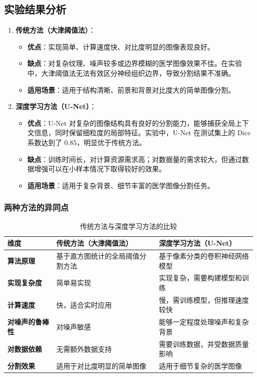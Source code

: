 \documentclass[12pt]{ctexart}
\begin{document}
\subsection*{实验结果分析}
\begin{enumerate}
    \item \textbf{传统方法（大津阈值法）}：
    \begin{itemize}
        \item \textbf{优点}：实现简单、计算速度快、对比度明显的图像表现良好。
        \item \textbf{缺点}：对复杂纹理、噪声较多或边界模糊的医学图像效果不佳。在实验中，大津阈值法无法有效区分神经组织边界，导致分割结果不准确。
        \item \textbf{适用场景}：适用于结构清晰、前景和背景对比度大的简单图像分割。
    \end{itemize}

    \item \textbf{深度学习方法（U-Net）}：
    \begin{itemize}
        \item \textbf{优点}：U-Net 对复杂的图像结构具有良好的分割能力，能够捕获全局上下文信息，同时保留细粒度的局部特征。实验中，U-Net 在测试集上的 Dice 系数达到了 0.85，明显优于传统方法。
        \item \textbf{缺点}：训练时间长，对计算资源需求高；对数据量的需求较大，但通过数据增强可以在小样本情况下取得较好的效果。
        \item \textbf{适用场景}：适用于复杂背景、细节丰富的医学图像分割任务。
    \end{itemize}
\end{enumerate}

\subsubsection*{两种方法的异同点}
\begin{table}[h!]
\centering
\begin{tabular}{|l|l|l|}
\hline
\textbf{维度}        & \textbf{传统方法（大津阈值法）}      & \textbf{深度学习方法（U-Net）}      \\ \hline
\textbf{算法原理}    & 基于直方图统计的全局阈值分割方法     & 基于像素分类的卷积神经网络模型       \\ \hline
\textbf{实现复杂度}  & 简单易实现                         & 实现复杂，需要构建模型和训练         \\ \hline
\textbf{计算速度}    & 快，适合实时应用                   & 慢，需训练模型，但推理速度较快        \\ \hline
\textbf{对噪声的鲁棒性} & 对噪声敏感                       & 能够一定程度处理噪声和复杂背景       \\ \hline
\textbf{对数据依赖}  & 无需额外数据支持                   & 需要训练数据，并受数据质量影响        \\ \hline
\textbf{分割效果}    & 适用于对比度明显的简单图像         & 适用于细节复杂的医学图像             \\ \hline
\end{tabular}
\caption{传统方法与深度学习方法的比较}
\end{table}
\end{document}
